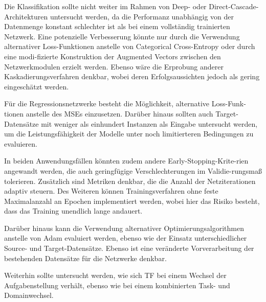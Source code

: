 Die Klassifikation sollte nicht weiter im Rahmen von Deep- oder Direct-Cascade-Architekturen untersucht werden, da die Performanz unabhängig von 
der Datenmenge konstant schlechter ist als bei einem vollständig trainierten Netzwerk. Eine potenzielle Verbesserung könnte nur durch die 
Verwendung alternativer Loss-Funktionen anstelle von Categorical Cross-Entropy oder durch eine modi-fizierte Konstruktion der Augmented Vectors 
zwischen den Netzwerkmodulen erzielt werden. Ebenso wäre die Erprobung anderer Kaskadierungsverfahren denkbar, wobei deren Erfolgsaussichten 
jedoch als gering eingeschätzt werden.

Für die Regressionsnetzwerke besteht die Möglichkeit, alternative Loss-Funk-tionen anstelle des MSEs einzusetzen. 
Darüber hinaus sollten auch Target-Datensätze mit weniger als einhundert Instanzen als Eingabe untersucht werden, um die Leistungsfähigkeit 
der Modelle unter noch limitierteren Bedingungen zu evaluieren.

In beiden Anwendungsfällen könnten zudem andere Early-Stopping-Krite-rien angewandt werden, die auch geringfügige Verschlechterungen im 
Validie-rungsmaß tolerieren. Zusätzlich sind Metriken denkbar, die die Anzahl der Netziterationen adaptiv steuern. Des Weiteren können 
Trainingsverfahren ohne feste Maximalanzahl an Epochen implementiert werden, wobei hier das Risiko besteht, dass das Training unendlich lange 
andauert.

Darüber hinaus kann die Verwendung alternativer Optimierungsalgorithmen anstelle von Adam evaluiert werden, ebenso wie der Einsatz 
unterschiedlicher Source- und Target-Datensätze. Ebenso ist eine veränderte Vorverarbeitung der bestehenden Datensätze für die Netzwerke 
denkbar.

Weiterhin sollte untersucht werden, wie sich TF bei einem Wechsel der Aufgabenstellung verhält, ebenso wie bei einem 
kombinierten Task- und Domainwechsel.
